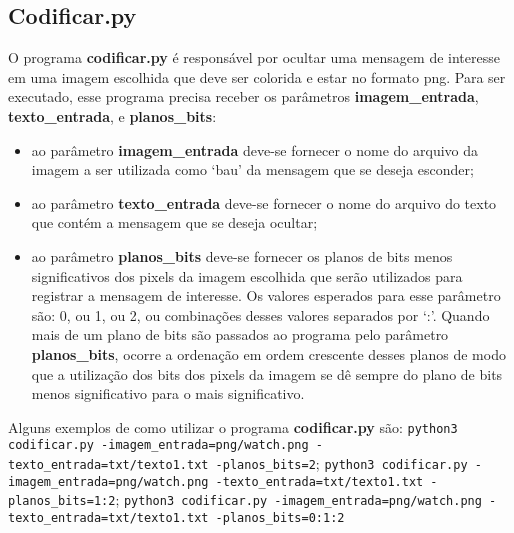 \documentclass{article}
\begin{document}
\subsection{Codificar.py}
O programa \textbf{codificar.py} é responsável por ocultar uma mensagem de interesse em uma imagem escolhida que deve ser colorida e estar no formato png. Para ser executado, esse programa precisa receber os parâmetros \textbf{imagem\_entrada}, \textbf{texto\_entrada}, e \textbf{planos\_bits}:


\begin{itemize}
	\item ao parâmetro \textbf{imagem\_entrada} deve-se fornecer o nome do arquivo da imagem a ser utilizada como `bau' da mensagem que se deseja esconder;
	\item ao parâmetro \textbf{texto\_entrada} deve-se fornecer o nome do arquivo do texto que contém a mensagem que
	se deseja ocultar;
	\item ao parâmetro \textbf{planos\_bits} deve-se fornecer os planos de bits menos significativos dos pixels da imagem escolhida que serão utilizados para registrar a mensagem de interesse. Os valores esperados para esse parâmetro são: 0, ou 1, ou 2, ou combinações desses valores separados por ‘:’. Quando mais de um plano de bits são passados ao programa pelo parâmetro \textbf{planos\_bits}, ocorre a ordenação em ordem crescente desses planos de modo que a utilização dos bits dos pixels da imagem se dê sempre do plano de bits menos significativo para o mais significativo.
\end{itemize}

Alguns exemplos de como utilizar o programa \textbf{codificar.py} são: \lstinline{python3 codificar.py -imagem_entrada=png/watch.png -texto_entrada=txt/texto1.txt -planos_bits=2}; \lstinline{python3 codificar.py -imagem_entrada=png/watch.png -texto_entrada=txt/texto1.txt -planos_bits=1:2}; \lstinline{python3 codificar.py -imagem_entrada=png/watch.png -texto_entrada=txt/texto1.txt -planos_bits=0:1:2} 
\end{document}
